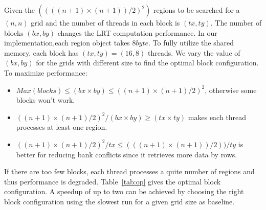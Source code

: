 \documentclass[AMA,LATO1COL]{WileyNJD-v2}
\begin{document}

Given the $((((n+1)\times(n+1))/2)^2)$ regions to be searched for a $(n,n)$ grid and the number of threads in each block is $(tx,ty)$. The number of blocks $(bx,by)$ changes the LRT computation performance. In our implementation,each region object takes $8byte$. To fully utilize the shared memory, each block has $(tx,ty)=(16,8)$ threads. We vary the value of $(bx,by)$ for the grids with different size to find the optimal block configuration. To maximize performance:
\begin{itemize}
\item $Max(blocks)\le (bx\times by)\le ((n+1)\times(n+1)/2)^2$, otherwise some blocks won't work.
\item $((n+1)\times(n+1)/2)^2/(bx\times by)\ge (tx\times ty)$ makes each thread processes at least one region.
\item $((n+1)\times(n+1)/2)^2/tx \le (((n+1)\times(n+1))/2))/ty$ is better for reducing bank conflicts since it retrieves more data by rows.
\end{itemize}
If there are too few blocks, each thread processes a quite number of regions and thus performance is degraded. Table~\ref{tab:op} gives the optimal block configuration. A speedup of up to two can be achieved by choosing the right block configuration using the slowest run for a given grid size as baseline.
\end{document}
